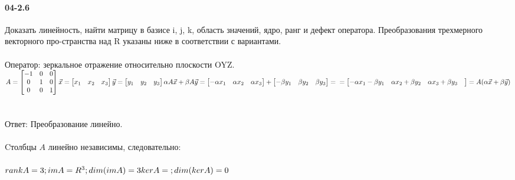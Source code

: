 \documentclass[12pt]{article}
\begin{document}
	\paragraph{04-2.6} Доказать линейность, найти матрицу в базисе {i, j, k}, область значений, ядро, ранг и дефект оператора. Преобразования трехмерного векторного про-странства над R указаны ниже в соответствии с вариантами.
	\\\\
	Оператор: зеркальное отражение относительно плоскости OYZ. \\
	\ensuremath{
		A = \begin{bmatrix}
			-1 & 0 & 0 \\
			0  & 1 & 0 \\
			0  & 0 & 1
		\end{bmatrix}
		\\\\
		\vec{x} = \begin{bmatrix} x_{1} & x_{2} & x_{3} \end{bmatrix} \\\\
		\vec{y} = \begin{bmatrix} y_{1} & y_{2} & y_{3} \end{bmatrix} \\\\
		\alpha A \vec{x} + \beta A \vec{y}
		= 
		\begin{bmatrix} 
			-\alpha x_{1} &
			\alpha x_{2} &
			\alpha x_{3} 
		\end{bmatrix}
		+
		\begin{bmatrix} 
			-\beta y_{1} &
			\beta y_{2} &
			\beta y_{3}
		\end{bmatrix}
		= \\\\ =
		\begin{bmatrix}
			-\alpha x_{1} - \beta y_{1} &
			\alpha x_{2} + \beta y_{2} &
			\alpha x_{3} + \beta y_{3} &
		\end{bmatrix} = A( \alpha \vec{x} + \beta \vec{y} )
	} \\\\\\
	Ответ:
	Преобразование линейно. \\\\
	Cтолбцы \ensuremath{A} линейно независимы, следовательно: \\\\
	\ensuremath{
		rank A = 3;
		im A = R ^3 ; dim (im A) = 3 \\
		ker A = {} ; dim (ker A) = 0
 	}
\end{document}
